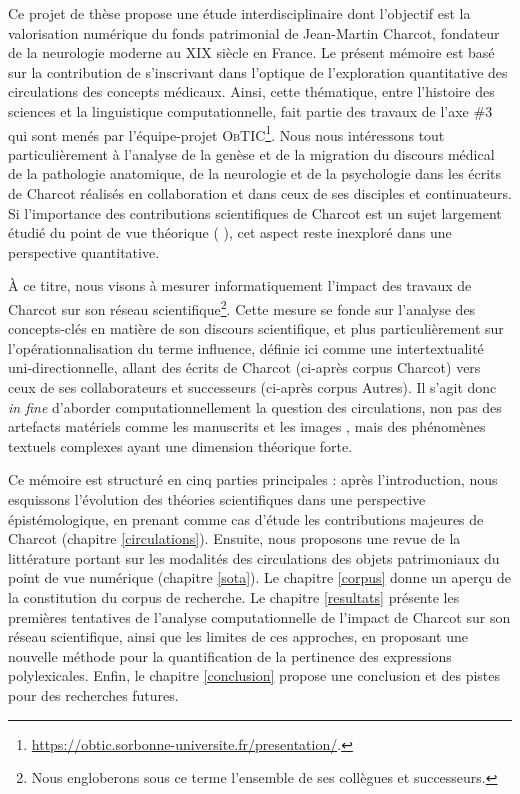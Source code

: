 Ce projet de thèse propose une étude interdisciplinaire dont l'objectif est la valorisation numérique du fonds patrimonial de Jean-Martin Charcot, fondateur de la neurologie moderne au XIX\ieme{} siècle en France. 
Le présent mémoire est basé sur la contribution de \citet{petkovic2023circulation} s'inscrivant dans l'optique de l'exploration quantitative des circulations des concepts médicaux. Ainsi, cette thématique, entre l'histoire des sciences et la linguistique computationnelle, fait partie des travaux de l'axe \#3 qui sont menés par l'équipe-projet \textsc{ObTIC}\footnote{\url{https://obtic.sorbonne-universite.fr/presentation/}.}. 
Nous nous intéressons tout particulièrement à l'analyse de la genèse et de la migration du discours médical de la pathologie anatomique, de la neurologie et de la psychologie dans les écrits de Charcot réalisés en collaboration et dans ceux de ses disciples et continuateurs. Si l'importance des contributions scientifiques de Charcot est un sujet largement étudié du point de vue théorique (\citealp{bogousslavsky2011following,broussolle2012,camargo2024} ), cet aspect reste inexploré dans une perspective quantitative.

À ce titre, nous visons à mesurer informatiquement l'impact des travaux de Charcot sur son réseau scientifique\footnote{Nous engloberons sous ce terme l'ensemble de ses collègues et successeurs.}. Cette mesure se fonde sur l'analyse des concepts-clés en matière de son discours scientifique, et plus particulièrement sur l'opérationnalisation du terme \og{}influence\fg{}, définie ici comme une intertextualité uni-directionnelle, allant des écrits de Charcot (ci-après corpus \og{}Charcot\fg{}) vers ceux de ses collaborateurs et successeurs (ci-après corpus \og{}Autres\fg{}). Il s'agit donc \textit{in fine} d'aborder computationnellement la question des circulations, non pas des artefacts matériels comme les manuscrits \citep{gabay2021katabase} et les images \citep{joyeux2019visual}, mais des phénomènes textuels complexes \citep{manjavacas} ayant une dimension théorique forte.

Ce mémoire est structuré en cinq parties principales : après l'introduction, nous esquissons l'évolution des théories scientifiques dans une perspective épistémologique, en prenant comme cas d'étude les contributions majeures de Charcot (chapitre \ref{circulations}).
Ensuite, nous proposons une revue de la littérature portant sur les modalités des circulations des objets patrimoniaux du point de vue numérique (chapitre \ref{sota}). Le chapitre \ref{corpus} donne un aperçu de la constitution du corpus de recherche. Le chapitre \ref{resultats} présente les premières tentatives de l'analyse computationnelle de l'impact de Charcot sur son réseau scientifique, ainsi que les limites de ces approches, en proposant une nouvelle méthode pour la quantification de la pertinence des expressions polylexicales. Enfin, le chapitre \ref{conclusion} propose une conclusion et des pistes pour des recherches futures.










